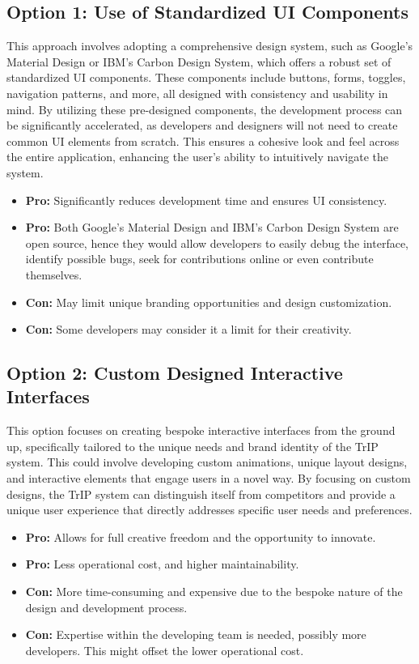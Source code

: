 \subsection*{Option 1: Use of Standardized UI Components}
This approach involves adopting a comprehensive design system, such as Google's Material Design or IBM’s Carbon Design System, which offers a robust set of standardized UI components. These components include buttons, forms, toggles, navigation patterns, and more, all designed with consistency and usability in mind. By utilizing these pre-designed components, the development process can be significantly accelerated, as developers and designers will not need to create common UI elements from scratch. This ensures a cohesive look and feel across the entire application, enhancing the user's ability to intuitively navigate the system.
\begin{itemize}
    \item \textbf{Pro:} Significantly reduces development time and ensures UI consistency.
    \item \textbf{Pro:} Both Google's Material Design and IBM's Carbon Design System are open source, hence they would allow developers to easily debug the interface, identify possible bugs, seek for contributions online or even contribute themselves.
    \item \textbf{Con:} May limit unique branding opportunities and design customization. 
    \item \textbf{Con:} Some developers may consider it a limit for their creativity. 
\end{itemize}

\subsection*{Option 2: Custom Designed Interactive Interfaces}
This option focuses on creating bespoke interactive interfaces from the ground up, specifically tailored to the unique needs and brand identity of the TrIP system. This could involve developing custom animations, unique layout designs, and interactive elements that engage users in a novel way. By focusing on custom designs, the TrIP system can distinguish itself from competitors and provide a unique user experience that directly addresses specific user needs and preferences.
\begin{itemize}
    \item \textbf{Pro:} Allows for full creative freedom and the opportunity to innovate.
    \item \textbf{Pro:} Less operational cost, and higher maintainability.
    \item \textbf{Con:} More time-consuming and expensive due to the bespoke nature of the design and development process.
    \item \textbf{Con:} Expertise within the developing team is needed, possibly more developers. This might offset the lower operational cost.
\end{itemize}

